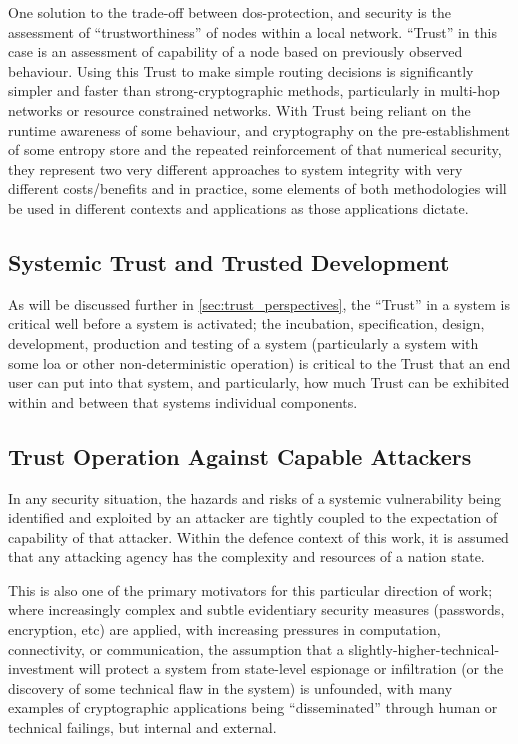 One solution to the trade-off between \gls{dos}-protection, and security is the assessment of ``trustworthiness'' of nodes within a local network. 
``Trust'' in this case is an assessment of capability of a node based on previously observed behaviour.
Using this Trust to make simple routing decisions is significantly simpler and faster than strong-cryptographic methods, particularly in multi-hop networks or resource constrained networks\cite{Cordasco2008}.
With Trust being reliant on the runtime awareness of some behaviour, and cryptography on the pre-establishment of some entropy store and the repeated reinforcement of that numerical security, they represent two very different approaches to system integrity with very different costs/benefits and in practice, some elements of both methodologies will be used in different contexts and applications as those applications dictate.

\subsection{Systemic Trust and Trusted Development}
As will be discussed further in \autoref{sec:trust_perspectives}, the ``Trust'' in a system is critical well before a system is activated; the incubation, specification, design, development, production and testing of a system (particularly a system with some \gls{loa} or other non-deterministic operation) is critical to the Trust that an end user can put into that system, and particularly, how much Trust can be exhibited within and between that systems individual components.

\subsection{Trust Operation Against Capable Attackers}\label{sec:capable_attackers}

In any security situation, the hazards and risks of a systemic vulnerability being identified and exploited by an attacker are tightly coupled to the expectation of capability of that attacker.
Within the defence context of this work, it is assumed that any attacking agency has the complexity and resources of a nation state.

This is also one of the primary motivators for this particular direction of work; where increasingly complex and subtle evidentiary security measures (passwords, encryption, etc) are applied, with increasing pressures in computation, connectivity, or communication, the assumption that a slightly-higher-technical-investment will protect a system from state-level espionage or infiltration (or the discovery of some technical flaw in the system) is unfounded, with many examples of cryptographic applications being ``disseminated'' through human or technical failings, but internal and external. 

